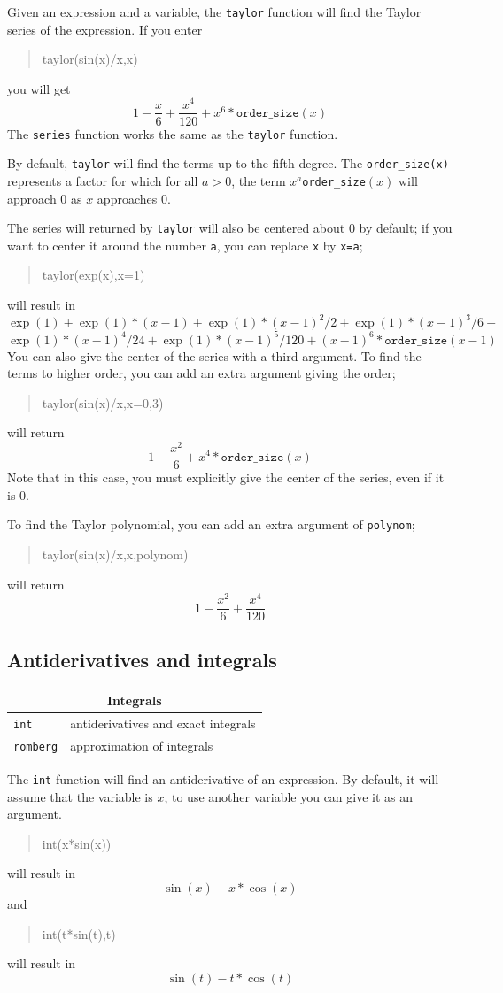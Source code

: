 \documentclass{article}
\newcommand{\xcasin}[1]
{\begin{quote}\ttfamily
#1
\end{quote}}
\newcommand{\xcasout}[1]
{\begin{equation*}
#1
\end{equation*}}
\begin{document}
Given an expression and a variable, the \texttt{taylor} function will
find the Taylor series of the expression.  If you enter
\xcasin{taylor(sin(x)/x,x)}
you will get
\xcasout{1-\frac{x}{6} + \frac{x^4}{120} + x^6*\texttt{order\_size}(x)}
The \texttt{series} function works the same as the \texttt{taylor}
function.

By default, \texttt{taylor} will find the terms up to the fifth
degree.  The \texttt{order\_size(x)} represents a factor for which 
for all $a>0$, the term $x^a$\texttt{order\_size}$(x)$ will approach 0
as $x$  approaches 0.  

The series will returned by \texttt{taylor} will also
be centered about 0 by default; if you want to center it around the number
\texttt{a}, you can replace \texttt{x} by \texttt{x=a};
\xcasin{taylor(exp(x),x=1)}
will result in
\xcasout{\exp(1)+\exp(1)*(x-1)+\exp(1)*(x-1)^2/2+ \exp(1)*(x-1)^3/6+}
\xcasout{\exp(1)*(x-1)^4/24+\exp(1)*(x-1)^5/120+(x-1)^6*\texttt{order\_size}(x-1)}
You can also give the center of the series with a third argument.
To find the terms to higher order, you can add an extra argument
giving the order;
\xcasin{taylor(sin(x)/x,x=0,3)}
will return
\xcasout{1-\frac{x^2}{6} + x^4*\texttt{order\_size}(x)}
Note that in this case, you must explicitly give the center of the
series, even if it is 0.

To find the Taylor polynomial, you can add an extra argument of
\texttt{polynom};
\xcasin{taylor(sin(x)/x,x,polynom)}
will return
\xcasout{1-\frac{x^2}{6} + \frac{x^4}{120}}


\subsection{Antiderivatives and integrals}

\begin{center}
\begin{tabular}{|p{}|p{}|}
\hline
\multicolumn{2}{|c|}{\textbf{Integrals}}\\
\hline\hline
\texttt{int} & antiderivatives and exact integrals\\
\texttt{romberg} & approximation of integrals\\
\hline
\end{tabular}
\end{center}

The \texttt{int} function will find an antiderivative of an
expression.  By default, it will assume that the variable is $x$, to
use another variable you can give it as an argument.
\xcasin{int(x*sin(x))}
will result in
\xcasout{\sin(x) - x*\cos(x)}
and
\xcasin{int(t*sin(t),t)}
will result in
\xcasout{\sin(t) - t*\cos(t)}
\end{document}

